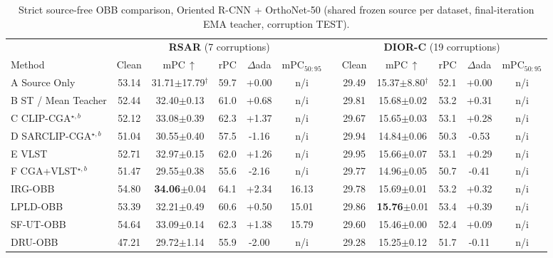 \begin{table}[t]
\centering
\scriptsize
\setlength{\tabcolsep}{3.2pt}
\renewcommand{\arraystretch}{1.1}
\caption{Strict source-free OBB comparison, Oriented R-CNN + OrthoNet-50 (shared frozen source per dataset, final-iteration EMA teacher, corruption TEST).}
\label{tab:rcnn-obb-sfod}
\begin{tabular}{@{}l ccccc c ccccc@{}}
\toprule
 & \multicolumn{5}{c}{\textbf{RSAR} (7 corruptions)} && \multicolumn{5}{c}{\textbf{DIOR-C} (19 corruptions)} \\
\cmidrule(lr){2-6}\cmidrule(lr){8-12}
Method & Clean & mPC\,$\uparrow$ & rPC & $\Delta$ada & mPC$_{50:95}$ && Clean & mPC\,$\uparrow$ & rPC & $\Delta$ada & mPC$_{50:95}$ \\
\midrule
A Source Only & 53.14 & 31.71{\tiny$\pm$17.79}$^{\dagger}$ & 59.7 & +0.00 & n/i &  & 29.49 & 15.37{\tiny$\pm$8.80}$^{\dagger}$ & 52.1 & +0.00 & n/i \\
B ST / Mean Teacher & 52.44 & 32.40{\tiny$\pm$0.13} & 61.0 & +0.68 & n/i &  & 29.81 & 15.68{\tiny$\pm$0.02} & 53.2 & +0.31 & n/i \\
C CLIP-CGA$^{\star,b}$ & 52.12 & 33.08{\tiny$\pm$0.39} & 62.3 & +1.37 & n/i &  & 29.67 & 15.65{\tiny$\pm$0.03} & 53.1 & +0.28 & n/i \\
D SARCLIP-CGA$^{\star,b}$ & 51.04 & 30.55{\tiny$\pm$0.40} & 57.5 & -1.16 & n/i &  & 29.94 & 14.84{\tiny$\pm$0.06} & 50.3 & -0.53 & n/i \\
E VLST & 52.71 & 32.97{\tiny$\pm$0.15} & 62.0 & +1.26 & n/i &  & 29.95 & 15.66{\tiny$\pm$0.07} & 53.1 & +0.29 & n/i \\
F CGA+VLST$^{\star,b}$ & 51.47 & 29.55{\tiny$\pm$0.38} & 55.6 & -2.16 & n/i &  & 29.77 & 14.96{\tiny$\pm$0.05} & 50.7 & -0.41 & n/i \\
\midrule
IRG-OBB & 54.80 & \textbf{34.06}{\tiny$\pm$0.04} & 64.1 & +2.34 & 16.13 &  & 29.78 & 15.69{\tiny$\pm$0.01} & 53.2 & +0.32 & n/i \\
LPLD-OBB & 53.39 & 32.21{\tiny$\pm$0.49} & 60.6 & +0.50 & 15.01 &  & 29.86 & \textbf{15.76}{\tiny$\pm$0.01} & 53.4 & +0.39 & n/i \\
SF-UT-OBB & 54.64 & 33.09{\tiny$\pm$0.14} & 62.3 & +1.38 & 15.79 &  & 29.60 & 15.46{\tiny$\pm$0.00} & 52.4 & +0.09 & n/i \\
DRU-OBB & 47.21 & 29.72{\tiny$\pm$1.14} & 55.9 & -2.00 & n/i &  & 29.28 & 15.25{\tiny$\pm$0.12} & 51.7 & -0.11 & n/i \\

\end{tabular}
\end{table}

